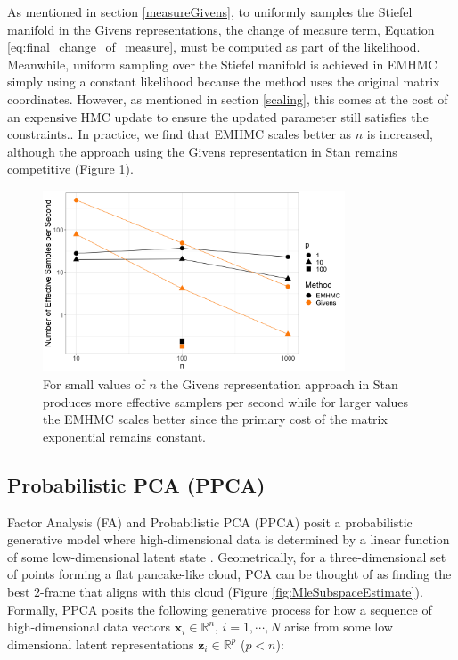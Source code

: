 \documentclass[ba]{imsart}
\numberwithin{equation}{section}
\theoremstyle{plain}
\begin{document}
\noindent As mentioned in section \ref{measureGivens}, to uniformly samples the Stiefel manifold in the Givens representations, the change of measure term, Equation \ref{eq:final_change_of_measure}, must be computed as part of the likelihood. Meanwhile, uniform sampling over the Stiefel manifold is achieved in EMHMC simply using a constant likelihood because the method uses the original matrix coordinates. However, as mentioned in section \ref{scaling}, this comes at the cost of an expensive HMC update to ensure the updated parameter still satisfies the constraints.. In practice, we find that EMHMC scales better as $n$ is increased, although the approach using the Givens representation in Stan remains competitive (Figure \ref{fig:scaling}).

\begin{figure}[h]
\centering
\vspace{.1in}
\includegraphics[width=0.8\textwidth]{figures/scaling.png}
\vspace{.05in}
\caption{For small values of $n$ the Givens representation approach in Stan produces more effective samplers per second while for larger values the EMHMC scales better since the primary cost of the matrix exponential remains constant.}
\label{fig:scaling}
\end{figure}

\subsection{Probabilistic PCA (PPCA)}
Factor Analysis (FA) and Probabilistic PCA (PPCA) \citep{tipping1999probabilistic} posit a probabilistic generative model where high-dimensional data is determined by a linear function of some low-dimensional latent state \cite[Chapt.~12]{murphy2012machine}. Geometrically, for a three-dimensional set of points forming a flat pancake-like cloud, PCA can be thought of as finding the best $2$-frame that aligns with this cloud (Figure \ref{fig:MleSubspaceEstimate}). Formally, PPCA posits the following generative process for how a sequence of high-dimensional data vectors $\mathbf{x}_i \in \mathbb{R}^n$, $i = 1, \cdots, N$ arise from some low dimensional latent representations $\mathbf{z}_i \in \mathbb{R}^p$ ($p < n$):
\end{document}
